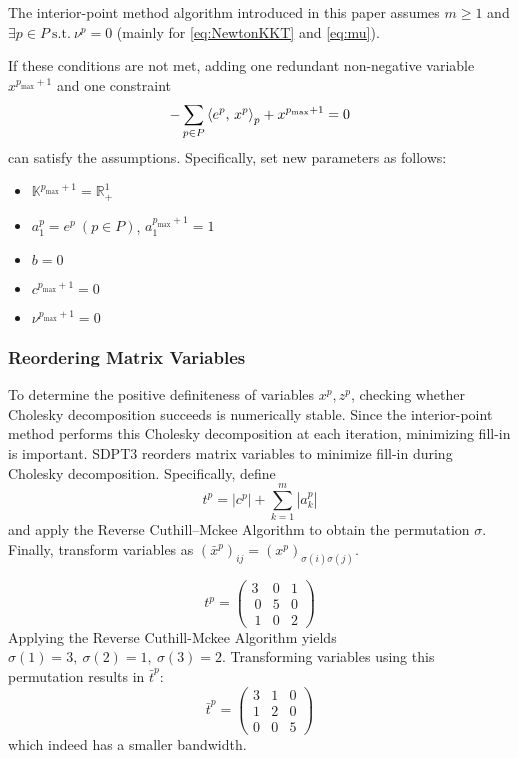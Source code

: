 The interior-point method algorithm introduced in this paper assumes $m \geq 1$ and $\exists p\in P ~ \text{s.t.} ~ \nu^p=0$ (mainly for \eqref{eq:NewtonKKT} and \eqref{eq:mu}).

If these conditions are not met, adding one redundant non-negative variable $x^{p_{\max} + 1}$ and one constraint
\[
  -\sum_{p\in P} \left\langle e^p, \, x^p \right\rangle_p + x^{p_{\max} + 1} = 0
\]
can satisfy the assumptions.
Specifically, set new parameters as follows:
\begin{itemize}
    \item $\mathbb{K}^{p_{\max} + 1} = \mathbb{R}^1_+$
    \item $a^{p}_1=e^p ~ (p \in P)$, $a^{p_{\max} + 1}_1 = 1$
    \item $b = 0$
    \item $c^{p_{\max} +1}=0$
    \item $\nu^{p_{\max} + 1} = 0$
\end{itemize}

\subsubsection{Reordering Matrix Variables}
To determine the positive definiteness of variables $x^p, z^p$, checking whether Cholesky decomposition succeeds is numerically stable.
Since the interior-point method performs this Cholesky decomposition at each iteration, minimizing fill-in is important.
SDPT3 reorders matrix variables to minimize fill-in during Cholesky decomposition.
Specifically, define
\[
  t^p = |c^p| + \sum_{k=1}^m |a^p_k|
\]
and apply the Reverse Cuthill--Mckee Algorithm to obtain the permutation $\sigma$.
Finally, transform variables as $(\bar{x}^p)_{ij} = (x^p)_{\sigma(i)\sigma(j)}$.

\begin{example}
\[
    t^p = \begin{pmatrix}
        3 & 0 & 1 \\\
        0 & 5 & 0 \\\
        1 & 0 & 2
    \end{pmatrix}
\] Applying the Reverse Cuthill-Mckee Algorithm yields $\sigma(1)=3, ~ \sigma(2)=1, ~ \sigma(3)=2$.
Transforming variables using this permutation results in $\bar{t}^p$:
\[
    \bar{t}^p = \begin{pmatrix}
        3 & 1 & 0 \\
        1 & 2 & 0 \\
        0 & 0 & 5
    \end{pmatrix}
\]
which indeed has a smaller bandwidth.
\end{example}

